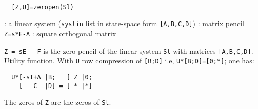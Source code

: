 \begin{mandesc}
   \\ %
\end{mandesc}
\begin{calling_sequence}
\begin{verbatim}
  [Z,U]=zeropen(Sl)  
\end{verbatim}
\end{calling_sequence}
\begin{parameters}
  \begin{varlist}
    : a linear system (\verb!syslin! list in state-space form \verb![A,B,C,D]!)
    : matrix pencil \verb!Z=s*E-A!
    : square orthogonal matrix
  \end{varlist}
\end{parameters}
\begin{mandescription}
  \verb!Z = sE - F!  is the zero pencil of the linear system \verb!Sl! with 
  matrices \verb![A,B,C,D]!. Utility function.
  With \verb!U! row compression of \verb![B;D]! i.e, \verb!U*[B;D]=[0;*]!; one has:
\begin{verbatim}
  U*[-sI+A |B;   [ Z |0;      
    [   C  |D] = [ * |*]
\end{verbatim}
The zeros of \verb!Z! are the zeros of \verb!Sl!.
\end{mandescription}
\begin{manseealso}
     
\end{manseealso}
